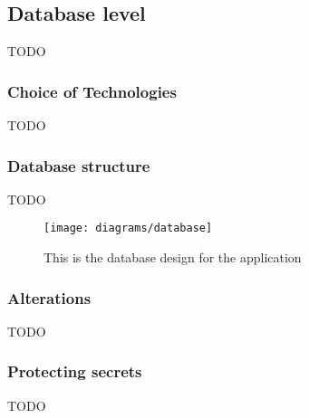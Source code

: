 \subsection{Database level}

{TODO}

\subsubsection*{Choice of Technologies}
\label{sec:database_choice_of_tech}

{TODO}

\subsubsection*{Database structure}

{TODO}

\begin{figure}[H]
    \centering
    \texttt{[image: diagrams/database]}
    \caption{This is the database design for the application}
    \label{fig:diagram_database_image}
\end{figure} 
\noindent

\subsubsection*{Alterations}

{TODO}

\subsubsection*{Protecting secrets}

{TODO}